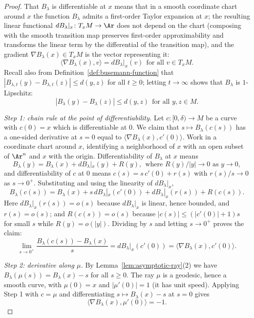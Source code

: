 \begin{proof}
That $B_\lambda$ is differentiable at $x$ means that in a smooth
coordinate chart around $x$ the function $B_\lambda$ admits a
first-order Taylor expansion at $x$; the resulting linear
functional $dB_\lambda|_x\colon T_xM\to\Ar$ does not depend on the
chart (composing with the smooth transition map preserves
first-order approximability and transforms the linear term by the
differential of the transition map), and the gradient $\nabla
B_\lambda(x)\in T_xM$ is the vector representing it:
$$\langle\nabla B_\lambda(x),v\rangle=dB_\lambda|_x(v)\ \
\text{for all } v\in T_xM.$$
Recall also from Definition~\ref{def:busemann-function} that
$|B_{\lambda,t}(y)-B_{\lambda,t}(z)|\le d(y,z)$ for all $t\ge0$;
letting $t\rightarrow\infty$ shows that $B_\lambda$ is
$1$-Lipschitz:
\begin{equation}\label{eqnBlipgrad}
|B_\lambda(y)-B_\lambda(z)|\le d(y,z)\ \ \text{for all } y,z\in M.
\end{equation}

{\em Step 1: chain rule at the point of differentiability.} Let
$c\colon [0,\delta)\to M$ be a curve with $c(0)=x$ which is
differentiable at $0$. We claim that $s\mapsto B_\lambda(c(s))$ has
a one-sided derivative at $s=0$ equal to $\langle\nabla
B_\lambda(x),c'(0)\rangle$. Work in a coordinate chart around $x$,
identifying a neighborhood of $x$ with an open subset of $\Ar^n$
and $x$ with the origin. Differentiability of $B_\lambda$ at $x$
means
$$B_\lambda(y)=B_\lambda(x)+dB_\lambda|_x(y)+R(y),\ \ \text{where }
R(y)/|y|\rightarrow 0 \text{ as } y\rightarrow 0,$$
and differentiability of $c$ at $0$ means $c(s)=s\,c'(0)+r(s)$ with
$r(s)/s\rightarrow 0$ as $s\rightarrow 0^+$. Substituting and using
the linearity of $dB_\lambda|_x$,
$$B_\lambda(c(s))=B_\lambda(x)+s\,dB_\lambda|_x(c'(0))
+dB_\lambda|_x(r(s))+R(c(s)).$$
Here $dB_\lambda|_x(r(s))=o(s)$ because $dB_\lambda|_x$ is linear,
hence bounded, and $r(s)=o(s)$; and $R(c(s))=o(s)$ because
$|c(s)|\le \left(|c'(0)|+1\right)s$ for small $s$ while
$R(y)=o(|y|)$. Dividing by $s$ and letting $s\rightarrow 0^+$
proves the claim:
$$\lim_{s\rightarrow 0^+}\frac{B_\lambda(c(s))-B_\lambda(x)}{s}
=dB_\lambda|_x(c'(0))=\langle\nabla B_\lambda(x),c'(0)\rangle.$$

{\em Step 2: derivative along $\mu$.} By
Lemma~\ref{lem:asymptotic-ray}(2) we have
$B_\lambda(\mu(s))=B_\lambda(x)-s$ for all $s\ge 0$. The ray $\mu$
is a geodesic, hence a smooth curve, with $\mu(0)=x$ and
$|\mu'(0)|=1$ (it has unit speed). Applying Step 1 with $c=\mu$
and differentiating $s\mapsto B_\lambda(x)-s$ at $s=0$ gives
$$\langle\nabla B_\lambda(x),\mu'(0)\rangle=-1.$$


\end{proof}

